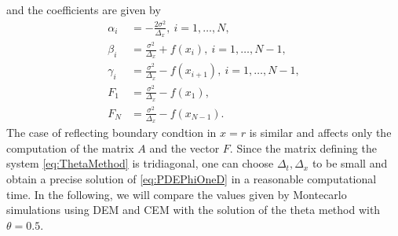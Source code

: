 and the coefficients are given by
\begin{equation}
\begin{split}
	\alpha_i &= -\frac{2\sigma^2}{\Delta_x}, \: i = 1, \dots, N, \\
	\beta_i  &= \frac{\sigma^2}{\Delta_x} + f(x_{i}), \: i = 1, \dots, N-1, \\
	\gamma_i &= \frac{\sigma^2}{\Delta_x} - f(x_{i+1}), \: i = 1, \dots, N-1, \\
	F_1      &= \frac{\sigma^2}{\Delta_x} - f(x_1), \\
	F_N      &= \frac{\sigma^2}{\Delta_x} - f(x_{N-1}).
\end{split}	
\end{equation}
The case of reflecting boundary condtion in $x = r$ is similar and affects only the computation of the matrix $A$ and the vector $F$. Since the matrix defining the system \eqref{eq:ThetaMethod} is tridiagonal, one can choose $\Delta_t, \Delta_x$ to be small and obtain a precise solution of \eqref{eq:PDEPhiOneD} in a reasonable computational time. In the following, we will compare the values given by Montecarlo simulations using DEM and CEM with the solution of the theta method with $\theta = 0.5$.

 
